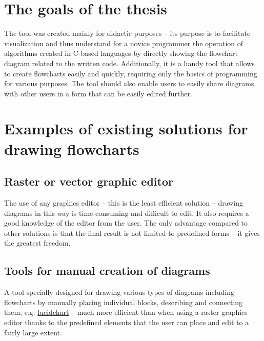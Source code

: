 \section{The goals of the thesis}
The tool was created mainly for didactic purposes -- its purpose is to facilitate visualization and thus understand for a novice programmer the operation of algorithms created in C-based languages by directly showing the flowchart diagram related to the written code. Additionally, it is a handy tool that allows to create flowcharts easily and quickly, requiring only the basics of programming for various purposes. The tool should also enable users to easily share diagrams with other users in a form that can be easily edited further.
	
\section{Examples of existing solutions for drawing flowcharts}

	\subsection{Raster or vector graphic editor} 
	The use of any graphics editor -- this is the least efficient solution -- drawing diagrams in this way is time-consuming and difficult to edit. It also requires a good knowledge of the editor from the user. The only advantage compared to other solutions is that the final result is not limited to predefined forms -- it gives the greatest freedom.
		
	\subsection{Tools for manual creation of diagrams} 			
	A tool specially designed for drawing various types of diagrams including flowcharts by manually placing individual blocks, describing and connecting them, e.g. \href{https://www.lucidchart.com/pages/examples/flowchart_software}{lucidchart} -- much more efficient than when using a raster graphics editor thanks to the predefined elements that the user can place and edit to a fairly large extent.
	
